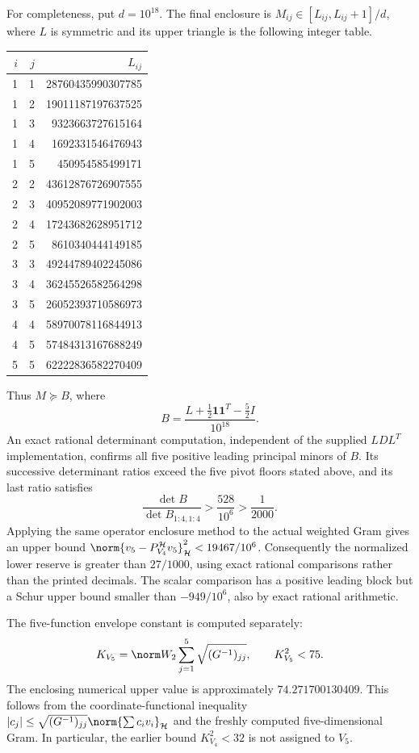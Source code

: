 \documentclass[11pt,a4paper]{article}
\numberwithin{equation}{section}
\theoremstyle{definition}\newtheorem{definition}[theorem]{Definition}
\theoremstyle{remark}\newtheorem{remark}[theorem]{Remark}
\newcommand{\Hh}{\mathcal H}\newcommand{\Hw}{\mathcal H}
\begin{document}
For completeness, put $d=10^{18}$. The final enclosure is
$M_{ij}\in[L_{ij},L_{ij}+1]/d$, where $L$ is symmetric and its upper
triangle is the following integer table.
\begin{center}
\begin{tabular}{rrr}\toprule
$i$&$j$&$L_{ij}$\\\midrule
1&1&28760435990307785\\
1&2&19011187197637525\\
1&3&9323663727615164\\
1&4&1692331546476943\\
1&5&450954585499171\\
2&2&43612876726907555\\
2&3&40952089771902003\\
2&4&17243682628951712\\
2&5&8610340444149185\\
3&3&49244789402245086\\
3&4&36245526582564298\\
3&5&26052393710586973\\
4&4&58970078116844913\\
4&5&57484313167688249\\
5&5&62222836582270409\\
\bottomrule\end{tabular}
\end{center}
Thus $M\succeq B$, where
\[
 B=\frac{L+\tfrac12\mathbf1\mathbf1^T-\tfrac52I}{10^{18}}.
\]
An exact rational determinant computation, independent of the supplied
$LDL^T$ implementation, confirms all five positive leading principal
minors of $B$. Its successive determinant ratios exceed the five pivot
floors stated above, and its last ratio satisfies
\[
 \frac{\det B}{\det B_{1:4,1:4}}>\frac{528}{10^6}>\frac1{2000}.
\]
Applying the same operator enclosure method to the actual weighted Gram
gives an upper bound
$\norm{v_5-P_{V_4}^{\Hh}v_5}_\Hh^2<19467/10^6$.
Consequently the normalized lower reserve is greater than $27/1000$,
using exact rational comparisons rather than the printed decimals.
The scalar comparison has a positive leading block but a Schur upper
bound smaller than $-949/10^6$, also by exact rational arithmetic.

The five-function envelope constant is computed separately:
\[
 K_{V_5}=\norm W_2\sum_{j=1}^5\sqrt{(G^{-1})_{jj}},\qquad
 K_{V_5}^2<75.
\]
The enclosing numerical upper value is approximately $74.271700130409$.
This follows from the coordinate-functional inequality
$|c_j|\le\sqrt{(G^{-1})_{jj}}\norm{\sum c_i v_i}_\Hh$ and the freshly
computed five-dimensional Gram. In particular, the earlier bound
$K_{V_4}^2<32$ is not assigned to $V_5$.
\end{document}
